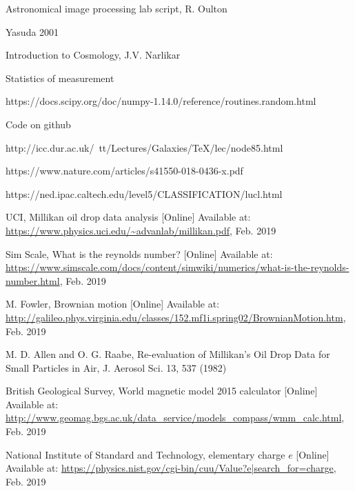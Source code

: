 \documentclass[journal]{IEEEtran}
\begin{document}
\begin{thebibliography}{1}

 Astronomical image processing lab script, R. Oulton

 Yasuda 2001

  Introduction to Cosmology, J.V. Narlikar

 Statistics of measurement 

 https://docs.scipy.org/doc/numpy-1.14.0/reference/routines.random.html

 Code on github

 http://icc.dur.ac.uk/~tt/Lectures/Galaxies/TeX/lec/node85.html

 https://www.nature.com/articles/s41550-018-0436-x.pdf

 https://ned.ipac.caltech.edu/level5/CLASSIFICATION/lucl.html

 UCI, Millikan oil drop data analysis [Online] Available at: \url{https://www.physics.uci.edu/~advanlab/millikan.pdf}, Feb. 2019

 Sim Scale, What is the reynolds number? [Online] Available at: \url{https://www.simscale.com/docs/content/simwiki/numerics/what-is-the-reynolds-number.html}, Feb. 2019

 M. Fowler, Brownian motion [Online] Available at: \url{http://galileo.phys.virginia.edu/classes/152.mf1i.spring02/BrownianMotion.htm}, Feb. 2019

 M. D. Allen and O. G. Raabe, Re-evaluation of Millikan’s Oil Drop Data for Small Particles in Air, J. Aerosol Sci. 13, 537 (1982)

 British Geological Survey, World magnetic model 2015 calculator [Online] Available at: \url{http://www.geomag.bgs.ac.uk/data\_service/models\_compass/wmm\_calc.html}, Feb. 2019

 National Institute of Standard and Technology, elementary charge 
 $e$ [Online] Available at: \url{https://physics.nist.gov/cgi-bin/cuu/Value?e|search\_for=charge}, Feb. 2019

\end{thebibliography}
\end{document}
